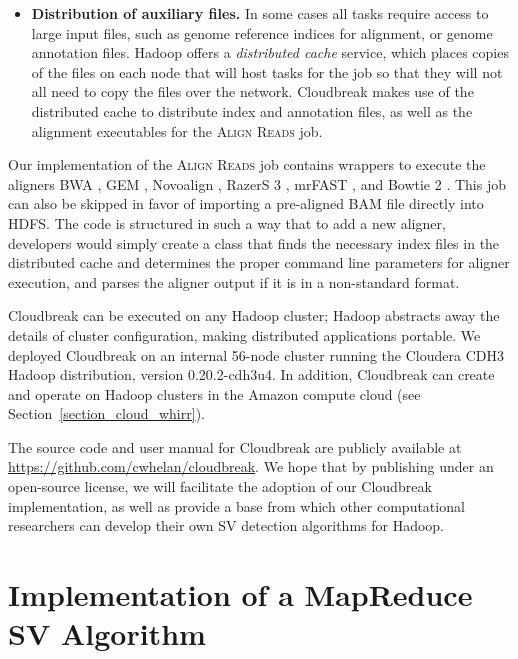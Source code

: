 \begin{itemize}
\item \textbf{Distribution of auxiliary files.} In some cases all tasks require access to large input files, such as genome reference indices for alignment, or genome annotation files. Hadoop offers a \emph{distributed cache} service, which places copies of the files on each node that will host tasks for the job so that they will not all need to copy the files over the network. Cloudbreak makes use of the distributed cache to distribute index and annotation files, as well as the alignment executables for the \textsc{Align Reads} job.
\end{itemize}

Our implementation of the \textsc{Align Reads} job contains wrappers to execute the aligners BWA \cite{Li:2009p836}, GEM \cite{MarcoSola:2012hm}, Novoalign \cite{novoalign}, RazerS 3 \cite{Weese:2012by}, mrFAST \cite{Alkan:2009cr}, and Bowtie 2 \cite{Langmead:2012jh}. This job can also be skipped in favor of importing a pre-aligned BAM file directly into HDFS. The code is structured in such a way that to add a new aligner, developers would simply create a class that finds the necessary index files in the distributed cache and determines the proper command line parameters for aligner execution, and parses the aligner output if it is in a non-standard format.

Cloudbreak can be executed on any Hadoop cluster; Hadoop abstracts away the details of cluster configuration, making distributed applications portable. We deployed Cloudbreak on an internal 56-node cluster running the Cloudera CDH3 Hadoop distribution, version 0.20.2-cdh3u4. In addition, Cloudbreak can create and operate on Hadoop clusters in the Amazon compute cloud (see Section~\ref{section_cloud_whirr}).

The source code and user manual for Cloudbreak are publicly available at \url{https://github.com/cwhelan/cloudbreak}. We hope that by publishing under an open-source license, we will facilitate the adoption of our Cloudbreak implementation, as well as provide a base from which other computational researchers can develop their own SV detection algorithms for Hadoop.

\section{Implementation of a MapReduce SV Algorithm}\label{section_user_defined_functions}

